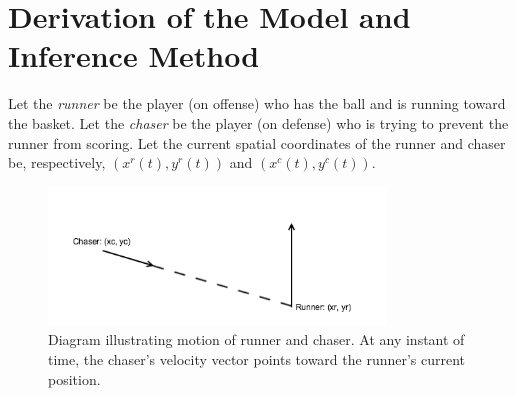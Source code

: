 \documentclass[graybox]{svmult}
\begin{document}


\section{Derivation of the Model and Inference Method}
\label{sec:2}
Let the \emph{runner} be the player (on offense) who has the ball and
is running toward the basket.  Let the \emph{chaser} be the player (on
defense) who is trying to prevent the runner from scoring.   Let the
current spatial coordinates of the runner and chaser be, respectively,
$(x^{r}(t), y^{r}(t))$ and $(x^{c}(t), y^{c}(t))$.

\begin{figure}[tb]
\centering
\includegraphics[width=0.8\textwidth]{pursuit.png}
\caption{Diagram illustrating motion of runner and chaser.  At any
  instant of time, the chaser's velocity vector points toward the
  runner's current position.}
\label{fig:pursuitdiagram}
\end{figure}
\end{document}
